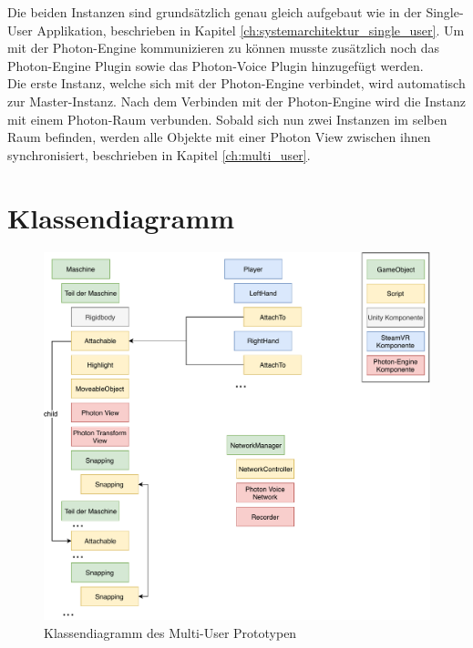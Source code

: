 Die beiden Instanzen sind grundsätzlich genau gleich aufgebaut wie in der Single-User Applikation, beschrieben in Kapitel \ref{ch:systemarchitektur_single_user}. Um mit der Photon-Engine kommunizieren zu können musste zusätzlich noch das Photon-Engine Plugin sowie das Photon-Voice Plugin hinzugefügt werden. \\
Die erste Instanz, welche sich mit der Photon-Engine verbindet, wird automatisch zur Master-Instanz. Nach dem Verbinden mit der Photon-Engine wird die Instanz mit einem Photon-Raum verbunden. Sobald sich nun zwei Instanzen im selben Raum befinden, werden alle Objekte mit einer Photon View zwischen ihnen synchronisiert, beschrieben in Kapitel \ref{ch:multi_user}.

\section{Klassendiagramm}

\begin{figure}[h!]
	\centering
	\includegraphics[keepaspectratio,width=0.65\linewidth]{img/Klassendiagramm_T2.pdf}
	\caption{Klassendiagramm des Multi-User Prototypen}
	\label{fig:klassendiagramm_multi_user}
\end{figure}

